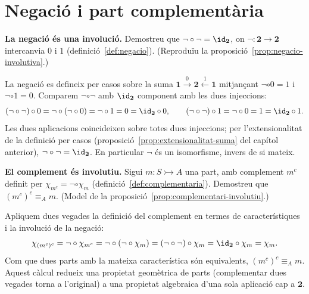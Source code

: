 \section{Negació i part complementària}\label{prac:complement}

\begin{exercici}
\textbf{La negació és una involució.} Demostreu que \(\neg\circ\neg=\id_{\mathbf2}\), on \(\neg:\mathbf2\to\mathbf2\) intercanvia \(0\) i \(1\) (definició~\ref{def:negacio}). (Reproduïu la proposició~\ref{prop:negacio-involutiva}.)
\end{exercici}
\begin{solucio}
La negació es defineix per casos sobre la suma \(\mathbf1\xrightarrow{0}\mathbf2\xleftarrow{1}\mathbf1\) mitjançant \(\neg\circ0=1\) i \(\neg\circ1=0\). Comparem \(\neg\circ\neg\) amb \(\id_{\mathbf2}\) component amb les dues injeccions:
\[
(\neg\circ\neg)\circ0=\neg\circ(\neg\circ0)=\neg\circ1=0=\id_{\mathbf2}\circ0,
\qquad
(\neg\circ\neg)\circ1=\neg\circ0=1=\id_{\mathbf2}\circ1.
\]
Les dues aplicacions coincideixen sobre totes dues injeccions; per l'extensionalitat de la definició per casos (proposició~\ref{prop:extensionalitat-suma} del capítol anterior), \(\neg\circ\neg=\id_{\mathbf2}\). En particular \(\neg\) és un isomorfisme, invers de si mateix.
\end{solucio}

\begin{exercici}
\textbf{El complement és involutiu.} Sigui \(m:S\rightarrowtail A\) una part, amb complement \(m^c\) definit per \(\chi_{m^c}=\neg\circ\chi_m\) (definició~\ref{def:complementaria}). Demostreu que \((m^c)^c\equiv_A m\). (Model de la proposició~\ref{prop:complementari-involutiu}.)
\end{exercici}
\begin{solucio}
Apliquem dues vegades la definició del complement en termes de característiques i la involució de la negació:
\[
\chi_{(m^c)^c}=\neg\circ\chi_{m^c}=\neg\circ(\neg\circ\chi_m)=(\neg\circ\neg)\circ\chi_m=\id_{\mathbf2}\circ\chi_m=\chi_m.
\]
Com que dues parts amb la mateixa característica són equivalents, \((m^c)^c\equiv_A m\). Aquest càlcul redueix una propietat geomètrica de parts (complementar dues vegades torna a l'original) a una propietat algebraica d'una sola aplicació cap a \(\mathbf2\).
\end{solucio}

